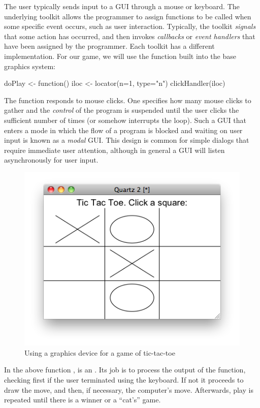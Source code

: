 The user typically sends input to a GUI through a mouse or keyboard. 
The underlying toolkit allows the programmer to assign
functions to be called when some specific event occurs, such as user interaction. Typically, the
toolkit \textit{signals} that some action has occurred, and then
invokes \textit{callbacks} or \textit{event handlers} that have been
assigned by the programmer. Each toolkit has a different implementation. 
For our game, we will use the  function built
into the base \R\/ graphics system:
\begin{Schunk}
\begin{Sinput}
 doPlay <- function() {
   iloc <- locator(n=1, type="n")
   clickHandler(iloc)
 }
\end{Sinput}
\end{Schunk}
%
The  function responds to mouse clicks. One specifies
how many mouse clicks to gather and the \textit{control} of the
program is suspended until the user clicks the sufficient number of
times (or somehow interrupts the loop). Such a GUI that enters a mode
in which the flow of a program is blocked and waiting on user input is
known as a \textit{modal} GUI. This design is
common for simple dialogs that require immediate user attention,
although in general a GUI will listen asynchronously for user input.

\begin{figure}
  \centering
  \includegraphics[width=.6\textwidth]{fig-basics-tic-tac-toe}
  \caption{Using a graphics device for a game of tic-tac-toe}
  \label{fig:basics-tic-tac-toe}
\end{figure}



In the above function ,  is
an . Its job is to process the output of the
 function, checking first if the user terminated
 using the keyboard. If not it proceeds to draw the
move, and then, if necessary, the computer's move. Afterwards, play is
repeated until there is a winner or a ``cat's'' game.


